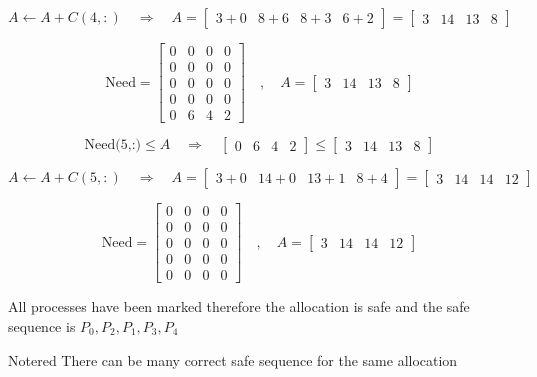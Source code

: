 \[A \gets A + C(4,:)\quad \Longrightarrow \quad A = \left[\begin{matrix} 3+0 & 8+6  & 8+3 & 6+2  \end{matrix}\right] = 
 \left[\begin{matrix} 3 & 14  & 13 & 8  \end{matrix}\right]\]

\newpage
\[\text{Need} = \left[\begin{matrix} 0 & 0 & 0 & 0 \\
                             0 & 0 & 0 & 0\\
                             0 & 0 & 0 & 0\\
                             0 & 0 & 0 & 0\\
                     0 & 6 & 4 & 2\end{matrix}\right]\quad,\quad
A =\left[\begin{matrix} 3 & 14  & 13 & 8   \end{matrix}\right] 
\]

\[ \text{Need(5,:)} \leq A \quad \Longrightarrow \quad
\left[\begin{matrix} 0& 6  &4 & 2   \end{matrix}\right] \leq
 \left[\begin{matrix} 3 & 14  & 13 & 8   \end{matrix}\right] \]

\[A \gets A + C(5,:)\quad \Longrightarrow \quad A = \left[\begin{matrix} 3+0 & 14+0  & 13+1 & 8+4  \end{matrix}\right] = 
 \left[\begin{matrix} 3 & 14  & 14 & 12  \end{matrix}\right]\]

\vspace{0.5cm}
\[\text{Need} = \left[\begin{matrix} 0 & 0 & 0 & 0 \\
                             0 & 0 & 0 & 0\\
                             0 & 0 & 0 & 0\\
                             0 & 0 & 0 & 0\\
                     0 & 0 & 0 & 0\end{matrix}\right]\quad,\quad
A =\left[\begin{matrix} 3 & 14  & 14 & 12   \end{matrix}\right] 
\]

\vspace{0.5cm}
\begin{center}
 All processes have been marked therefore the allocation is safe and the safe sequence is
\(P_0,P_2,P_1,P_3,P_4\)   
\end{center}

\begin{prettyBox}{Note}{red}
There can be many correct safe sequence for the same allocation 
\end{prettyBox}
